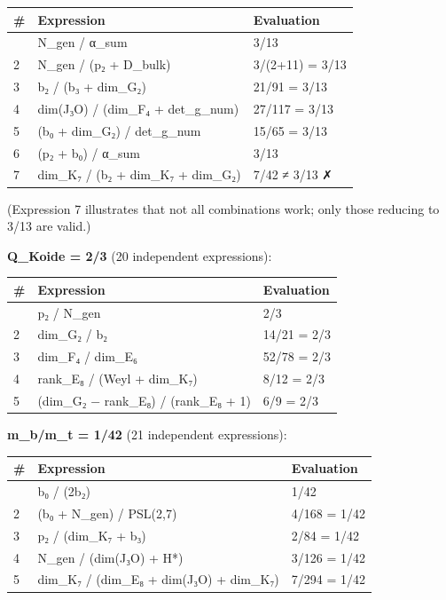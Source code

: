 \documentclass[11pt,a4paper]{article}
\begin{document}
\begin{longtable}[]{@{}lll@{}}
\toprule\noalign{}
\# & Expression & Evaluation \\
\midrule\noalign{}
\endhead
\bottomrule\noalign{}
\endlastfoot
1 & N\_\allowbreak{}gen / α\_\allowbreak{}sum & 3/13 \\
2 & N\_\allowbreak{}gen / (p₂ + D\_\allowbreak{}bulk) & 3/(2+11) = 3/13 \\
3 & b₂ / (b₃ + dim\_\allowbreak{}G₂) & 21/91 = 3/13 \\
4 & dim(J₃O) / (dim\_\allowbreak{}F₄ + det\_\allowbreak{}g\_\allowbreak{}num) & 27/117 = 3/13 \\
5 & (b₀ + dim\_\allowbreak{}G₂) / det\_\allowbreak{}g\_\allowbreak{}num & 15/65 = 3/13 \\
6 & (p₂ + b₀) / α\_\allowbreak{}sum & 3/13 \\
7 & dim\_\allowbreak{}K₇ / (b₂ + dim\_\allowbreak{}K₇ + dim\_\allowbreak{}G₂) & 7/42 ≠ 3/13 ✗ \\
\end{longtable}

(Expression 7 illustrates that not all combinations work; only those reducing to 3/13 are valid.)

\textbf{Q\_\allowbreak{}Koide = 2/3} (20 independent expressions):

\begin{longtable}[]{@{}lll@{}}
\toprule\noalign{}
\# & Expression & Evaluation \\
\midrule\noalign{}
\endhead
\bottomrule\noalign{}
\endlastfoot
1 & p₂ / N\_\allowbreak{}gen & 2/3 \\
2 & dim\_\allowbreak{}G₂ / b₂ & 14/21 = 2/3 \\
3 & dim\_\allowbreak{}F₄ / dim\_\allowbreak{}E₆ & 52/78 = 2/3 \\
4 & rank\_\allowbreak{}E₈ / (Weyl + dim\_\allowbreak{}K₇) & 8/12 = 2/3 \\
5 & (dim\_\allowbreak{}G₂ − rank\_\allowbreak{}E₈) / (rank\_\allowbreak{}E₈ + 1) & 6/9 = 2/3 \\
\end{longtable}

\textbf{m\_\allowbreak{}b/m\_\allowbreak{}t = 1/42} (21 independent expressions):

\begin{longtable}[]{@{}lll@{}}
\toprule\noalign{}
\# & Expression & Evaluation \\
\midrule\noalign{}
\endhead
\bottomrule\noalign{}
\endlastfoot
1 & b₀ / (2b₂) & 1/42 \\
2 & (b₀ + N\_\allowbreak{}gen) / PSL(2,7) & 4/168 = 1/42 \\
3 & p₂ / (dim\_\allowbreak{}K₇ + b₃) & 2/84 = 1/42 \\
4 & N\_\allowbreak{}gen / (dim(J₃O) + H*) & 3/126 = 1/42 \\
5 & dim\_\allowbreak{}K₇ / (dim\_\allowbreak{}E₈ + dim(J₃O) + dim\_\allowbreak{}K₇) & 7/294 = 1/42 \\
\end{longtable}
\end{document}
